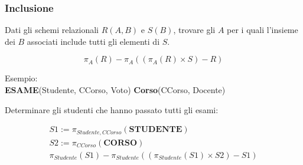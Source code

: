\subsubsection{Inclusione}

Dati gli schemi relazionali $R(A,B)$ e $S(B)$, trovare gli $A$ per i quali l'insieme
dei $B$ associati include tutti gli elementi di $S$.

\begin{displaymath}
  \pi_{A}(R) - \pi_{A}((\pi_{A}(R) \times S) - R)
\end{displaymath}

Esempio: \\

\noindent
\textbf{ESAME}(Studente, CCorso, Voto)
\textbf{Corso}(CCorso, Docente) \\
\noindent

Determinare gli studenti che hanno passato tutti gli esami:

\begin{gather*}
  S1 := \pi_{Studente,CCorso}(\textbf{STUDENTE}) \\
  S2 := \pi_{CCorso}(\textbf{CORSO}) \\
  \pi_{Studente}(S1) - \pi_{Studente}((\pi_{Studente}(S1) \times S2) - S1)
\end{gather*}